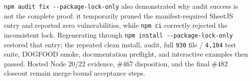 \texttt{n\allowbreak{}p\allowbreak{}m\allowbreak{} \allowbreak{}a\allowbreak{}u\allowbreak{}d\allowbreak{}i\allowbreak{}t\allowbreak{} \allowbreak{}f\allowbreak{}i\allowbreak{}x\allowbreak{} \allowbreak{}-\allowbreak{}-\allowbreak{}p\allowbreak{}a\allowbreak{}c\allowbreak{}k\allowbreak{}a\allowbreak{}g\allowbreak{}e\allowbreak{}-\allowbreak{}l\allowbreak{}o\allowbreak{}c\allowbreak{}k\allowbreak{}-\allowbreak{}o\allowbreak{}n\allowbreak{}l\allowbreak{}y} also demonstrated why audit success is not the complete proof: it temporarily pruned the manifest-required SheetJS entry and reported zero vulnerabilities, while \texttt{n\allowbreak{}p\allowbreak{}m\allowbreak{} \allowbreak{}c\allowbreak{}i} correctly rejected the inconsistent lock. Regenerating through \texttt{n\allowbreak{}p\allowbreak{}m\allowbreak{} \allowbreak{}i\allowbreak{}n\allowbreak{}s\allowbreak{}t\allowbreak{}a\allowbreak{}l\allowbreak{}l\allowbreak{} \allowbreak{}-\allowbreak{}-\allowbreak{}p\allowbreak{}a\allowbreak{}c\allowbreak{}k\allowbreak{}a\allowbreak{}g\allowbreak{}e\allowbreak{}-\allowbreak{}l\allowbreak{}o\allowbreak{}c\allowbreak{}k\allowbreak{}-\allowbreak{}o\allowbreak{}n\allowbreak{}l\allowbreak{}y} restored that entry; the repeated clean install, audit, full \texttt{9\allowbreak{}3\allowbreak{}0} file / \texttt{4\allowbreak{},\allowbreak{}1\allowbreak{}0\allowbreak{}4} test suite, DOGFOOD smoke, documentation preflight, and interactive examples then passed. Hosted Node 20/22 evidence, \#467 disposition, and the final \#482 closeout remain merge-bound acceptance steps.

